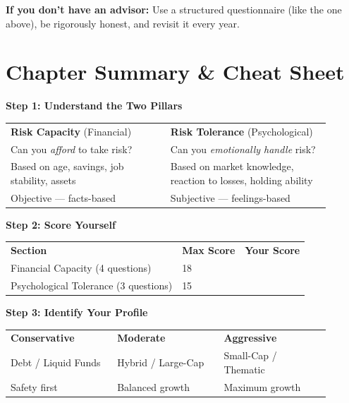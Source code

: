 \documentclass[12pt,a4paper]{article}
\begin{document}
\textbf{If you don't have an advisor:} Use a structured questionnaire (like the one above), be rigorously honest, and revisit it every year.

\section*{Chapter Summary \& Cheat Sheet}

\begin{cheatsheet}

\textbf{\color{PrimaryBlue}\large Step 1: Understand the Two Pillars}

\medskip
\begin{tabular}{p{0.45\linewidth} p{0.45\linewidth}}
\textbf{Risk Capacity} (Financial) & \textbf{Risk Tolerance} (Psychological)\\
Can you \textit{afford} to take risk? & Can you \textit{emotionally handle} risk?\\
Based on age, savings, job stability, assets & Based on market knowledge, reaction to losses, holding ability\\
Objective --- facts-based & Subjective --- feelings-based\\
\end{tabular}

\bigskip
\textbf{\color{PrimaryBlue}\large Step 2: Score Yourself}

\medskip
\begin{tabular}{lll}
\textbf{Section} & \textbf{Max Score} & \textbf{Your Score}\\
Financial Capacity (4 questions) & 18 & \underline{\hspace{1.5cm}}\\
Psychological Tolerance (3 questions) & 15 & \underline{\hspace{1.5cm}}\\
\end{tabular}

\bigskip
\textbf{\color{PrimaryBlue}\large Step 3: Identify Your Profile}

\medskip
\begin{tabular}{p{0.3\linewidth} p{0.3\linewidth} p{0.3\linewidth}}
\textbf{Conservative} & \textbf{Moderate} & \textbf{Aggressive}\\
Debt / Liquid Funds & Hybrid / Large-Cap & Small-Cap / Thematic\\
Safety first & Balanced growth & Maximum growth\\
\end{tabular}


\end{cheatsheet}
\end{document}
